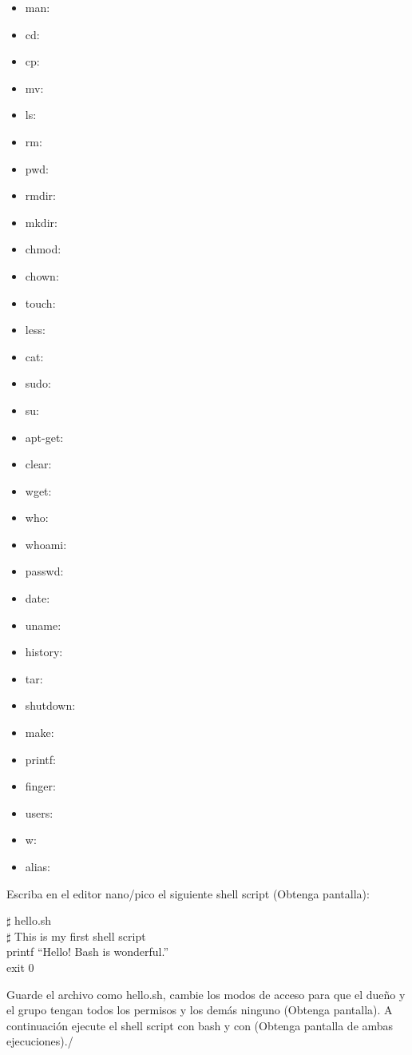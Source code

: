 			\begin{itemize}

				\item man:
				\item cd:
				\item cp:
				\item mv: 
				\item ls: 
				\item rm: 
				\item pwd:
				\item rmdir: 
				\item mkdir:
				\item chmod: 
				\item chown:
				\item touch:
				\item less:
				\item cat:
				\item sudo:
				\item su:
				\item apt-get:
				\item clear:
				\item wget:
				\item who:
				\item whoami:
				\item passwd:
				\item date:
				\item uname:
				\item history:
				\item tar:
				\item shutdown:
				\item make:	
				\item printf: 
				\item finger:
				\item users:
				\item w:
				\item alias:

			\end{itemize}

	Escriba en el editor nano/pico el siguiente shell script (Obtenga pantalla):
	
	\begin{flushleft}
		$\sharp$ hello.sh \\
		$\sharp$ This is my first shell script \\
		printf “Hello! Bash is wonderful.” \\
		exit 0
	\end{flushleft}

	Guarde el archivo como hello.sh, cambie los modos de acceso para que el dueño y el grupo tengan todos los permisos y los demás ninguno (Obtenga pantalla). A continuación ejecute el shell script con bash y con (Obtenga pantalla de ambas ejecuciones)./